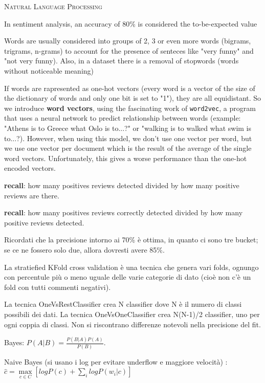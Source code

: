 \documentclass[a4paper,10pt]{article} %
\newcommand{\msection}[1]{%
    {\newpage\bigbreak \bigbreak \par \hfil \huge \textsc {#1}}\par}
\renewcommand{\b}[1]{%
    {\textbf{#1}}}
\renewcommand{\t}[1]{%
    {\texttt{#1}}}
\begin{document}
\msection{Natural Language Processing}


\begin{multicols}{2} 

In sentiment analysis, an accuracy of 80\% is considered the to-be-expected value

Words are usually considered into groups of 2, 3 or even more words (bigrams, trigrams, n-grams) to account for the presence of senteces like "very funny" and "not very funny).  Also, in a dataset there is a removal of stopwords (words without noticeable meaning)

If words are rapresented as one-hot vectors (every word is a vector of the size of the dictionary of words and only one bit is set to "1"), they are all equidistant. So we introduce \b{word vectors}, using the fascinating work of \t{word2vec}, a program that uses a neural network to predict relationship between words (example: "Athens is to Greece what Oslo is to...?" or "walking is to walked what swim is to...?). However, when using this model, we don't use one vector per word, but we use one vector per document which is the result of the average of the single word vectors. Unfortunately, this gives a worse performance than the one-hot encoded vectors.


\b{recall}: how many positives reviews detected divided by how many positive reviews are there.

\b{recall}: how many positives reviews correctly detected divided by how many positive reviews detected.

Ricordati che la precisione intorno ai 70\% è ottima, in quanto ci sono tre bucket; se ce ne fossero solo due, allora dovresti avere 85\%.

La stratiefied KFold cross validation è una tecnica che genera vari folds, ognungo con percentule più o meno uguale delle varie categorie di dato (cioè non c'è un fold con tutti commenti negativi).

La tecnica OneVsRestClassifier crea N classifier dove N è il numero di classi possibili dei dati. La tecnica OneVsOneClassifier crea N(N-1)/2 classifier, uno per ogni coppia di classi. Non si riscontrano differenze notevoli nella precisione del fit.

Bayes: $P(A|B) = \frac{P(B|A)P(A)}{P(B)}$.

Naive Bayes (si usano i log per evitare underflow e maggiore velocità) : $\hat{c} = \max\limits_{c \in C} \left[ log P(c) + \sum\limits_{i} log P(w_i | c) \right]$


\end{multicols}
\end{document}
